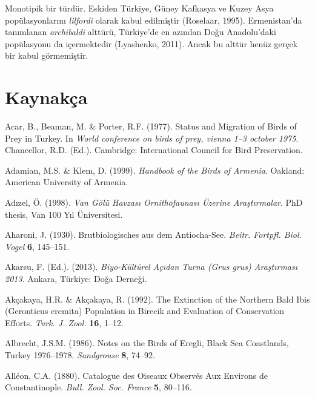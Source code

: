 \documentclass[
  a4paper,
  DIV=11,
  numbers=noendperiod]{scrreprt}
\newlength{\cslhangindent}
\newenvironment{CSLReferences}[2] %
 {\begin{list}{}{%
  \setlength{\itemindent}{0pt}
  \setlength{\leftmargin}{0pt}
  \setlength{\parsep}{0pt}
  \ifodd #1
   \setlength{\leftmargin}{\cslhangindent}
   \setlength{\itemindent}{-1\cslhangindent}
  \fi
  \setlength{\itemsep}{#2\baselineskip}}}
 {\end{list}}
\begin{document}
Monotipik bir türdür. Eskiden Türkiye, Güney Kafkasya ve Kuzey Asya
popülasyonlarını \emph{lilfordi} olarak kabul edilmiştir (Roselaar,
1995). Ermenistan'da tanımlanan \emph{archibaldi} alttürü, Türkiye'de en
azından Doğu Anadolu'daki popülasyonu da içermektedir (Lyashenko, 2011).
Ancak bu alttür henüz gerçek bir kabul görmemiştir.


\chapter*{Kaynakça}\label{kaynakuxe7a}


\label{refs}
\begin{CSLReferences}{1}{1}
Acar, B., Beaman, M. \& Porter, R.F. (1977). {Status and Migration of
Birds of Prey in Turkey}. In \emph{World conference on birds of prey,
vienna 1--3 october 1975}. Chancellor, R.D. (Ed.). Cambridge:
International Council for Bird Preservation.

Adamian, M.S. \& Klem, D. (1999). \emph{{Handbook of the Birds of
Armenia}}. Oakland: American University of Armenia.

Adızel, Ö. (1998). \emph{{Van Gölü Havzası Ornithofaunası Üzerine
Araştırmalar}}. PhD thesis, Van 100 Yıl Üniversitesi.

Aharoni, J. (1930). {Brutbiologisches aus dem Antiocha-See}.
\emph{Beitr. Fortpfl. Biol. Vogel} \textbf{6}, 145--151.

Akarsu, F. (Ed.). (2013). \emph{{Biyo-Kültürel Açıdan Turna (\emph{Grus
grus}) Araştırması 2013}}. Ankara, Türkiye: Doğa Derneği.

Akçakaya, H.R. \& Akçakaya, R. (1992). {The Extinction of the Northern
Bald Ibis ({Geronticus eremita}) Population in Birecik and Evaluation of
Conservation Efforts}. \emph{Turk. J. Zool.} \textbf{16}, 1--12.

Albrecht, J.S.M. (1986). {Notes on the Birds of Eregli, Black Sea
Coastlands, Turkey 1976--1978}. \emph{Sandgrouse} \textbf{8}, 74--92.

Alléon, C.A. (1880). {Catalogue des Oiseaux Observés Aux Environs de
Constantinople}. \emph{Bull. Zool. Soc. France} \textbf{5}, 80--116.


\end{CSLReferences}
\end{document}
